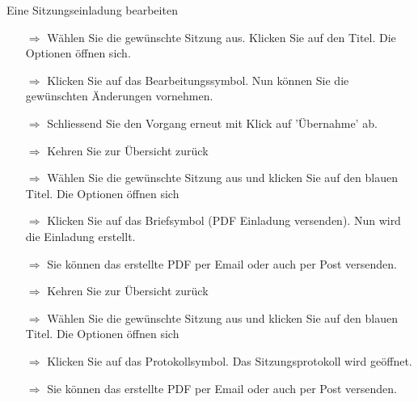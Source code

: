 \documentclass[twocolumn]{article}
\begin{document}
\begin{beamerlikethm}{Eine Sitzungseinladung bearbeiten}
\begin{itemize}
  \item[$\Longrightarrow$] Wählen Sie die gewünschte Sitzung aus. Klicken Sie auf den Titel. Die Optionen öffnen sich.
  \item[$\Longrightarrow$] Klicken Sie auf das Bearbeitungssymbol. Nun können Sie die gewünschten Änderungen vornehmen.
  \item[$\Longrightarrow$] Schliessend Sie den Vorgang erneut mit Klick auf 'Übernahme' ab.
\end{itemize}
\end{beamerlikethm}




\begin{tcolorbox}[colback=blue!5,colframe=blue!40!black,title=Einladung versenden]
\begin{itemize}
  \item[$\Longrightarrow$] Kehren Sie zur Übersicht zurück
  \item[$\Longrightarrow$] Wählen Sie die gewünschte Sitzung aus und klicken Sie auf den blauen Titel. Die Optionen öffnen sich
  \item[$\Longrightarrow$] Klicken Sie auf das Briefsymbol (PDF Einladung versenden). Nun wird die Einladung erstellt.
  \item[$\Longrightarrow$] Sie können das erstellte PDF per Email oder auch per Post versenden.
\end{itemize}
\end{tcolorbox}



\begin{tcolorbox}[colback=blue!5,colframe=blue!40!black,title=Protokoll bearbeiten]
\begin{itemize}
  \item[$\Longrightarrow$] Kehren Sie zur Übersicht zurück
  \item[$\Longrightarrow$] Wählen Sie die gewünschte Sitzung aus und klicken Sie auf den blauen Titel. Die Optionen öffnen sich
  \item[$\Longrightarrow$] Klicken Sie auf das Protokollsymbol. Das Sitzungsprotokoll wird geöffnet.
  \item[$\Longrightarrow$] Sie können das erstellte PDF per Email oder auch per Post versenden.
\end{itemize}
\end{tcolorbox}
\end{document}
